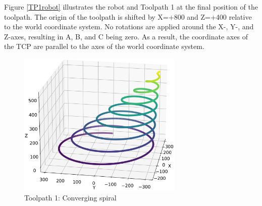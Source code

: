 Figure \ref{TP1robot} illustrates the robot and Toolpath 1 at the final position of the toolpath. The origin of the toolpath is shifted by X=+800 and Z=+400 relative to the world coordinate system. No rotations are applied around the X-, Y-, and Z-axes, resulting in A, B, and C being zero. As a result, the coordinate axes of the \acrshort{TCP} are parallel to the axes of the world coordinate system. 

\begin{figure}[H]%
	\centering
	\includegraphics[width=0.7\textwidth]{figures/path1.png}
	\caption{Toolpath 1: Converging spiral}
	\label{path1}
\end{figure}


